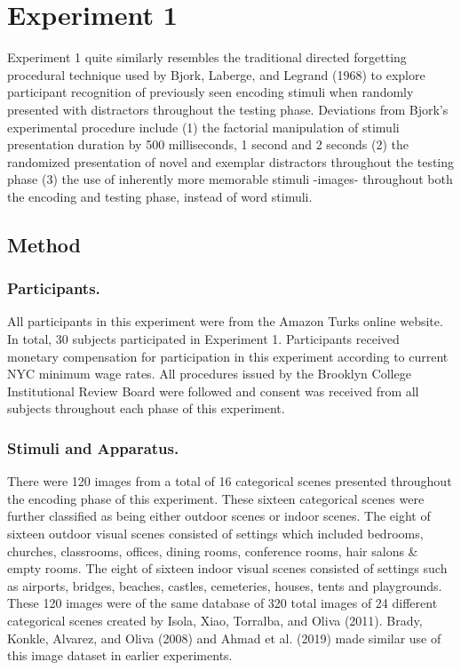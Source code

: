 \documentclass[
  english,
  man,floatsintext]{apa6}
\begin{document}
\hypertarget{experiment-1}{%
\section{Experiment 1}\label{experiment-1}}

Experiment 1 quite similarly resembles the traditional directed forgetting procedural technique used by Bjork, Laberge, and Legrand (1968) to explore participant recognition of previously seen encoding stimuli when randomly presented with distractors throughout the testing phase. Deviations from Bjork's experimental procedure include (1) the factorial manipulation of stimuli presentation duration by 500 milliseconds, 1 second and 2 seconds (2) the randomized presentation of novel and exemplar distractors throughout the testing phase (3) the use of inherently more memorable stimuli -images- throughout both the encoding and testing phase, instead of word stimuli.

\hypertarget{method}{%
\subsection{Method}\label{method}}

\hypertarget{participants.}{%
\subsubsection{Participants.}\label{participants.}}

All participants in this experiment were from the Amazon Turks online website. In total, 30 subjects participated in Experiment 1. Participants received monetary compensation for participation in this experiment according to current NYC minimum wage rates. All procedures issued by the Brooklyn College Institutional Review Board were followed and consent was received from all subjects throughout each phase of this experiment.

\hypertarget{stimuli-and-apparatus.}{%
\subsubsection{Stimuli and Apparatus.}\label{stimuli-and-apparatus.}}

There were 120 images from a total of 16 categorical scenes presented throughout the encoding phase of this experiment. These sixteen categorical scenes were further classified as being either outdoor scenes or indoor scenes. The eight of sixteen outdoor visual scenes consisted of settings which included bedrooms, churches, classrooms, offices, dining rooms, conference rooms, hair salons \& empty rooms. The eight of sixteen indoor visual scenes consisted of settings such as airports, bridges, beaches, castles, cemeteries, houses, tents and playgrounds. These 120 images were of the same database of 320 total images of 24 different categorical scenes created by Isola, Xiao, Torralba, and Oliva (2011). Brady, Konkle, Alvarez, and Oliva (2008) and Ahmad et al. (2019) made similar use of this image dataset in earlier experiments.
\end{document}
